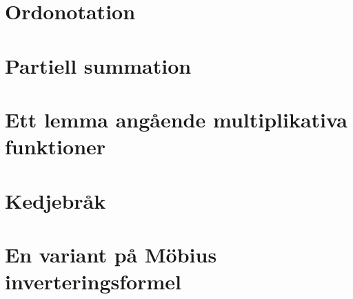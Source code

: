 \documentclass[a4paper]{article}
\begin{document}
%


\newpage
\printbibliography

\medskip

\newpage
\appendix
\section{Ordonotation}

\section{Partiell summation}
\section{Ett lemma angående multiplikativa funktioner}

\section{Kedjebråk}
\section{En variant på Möbius inverteringsformel}

\end{document}
